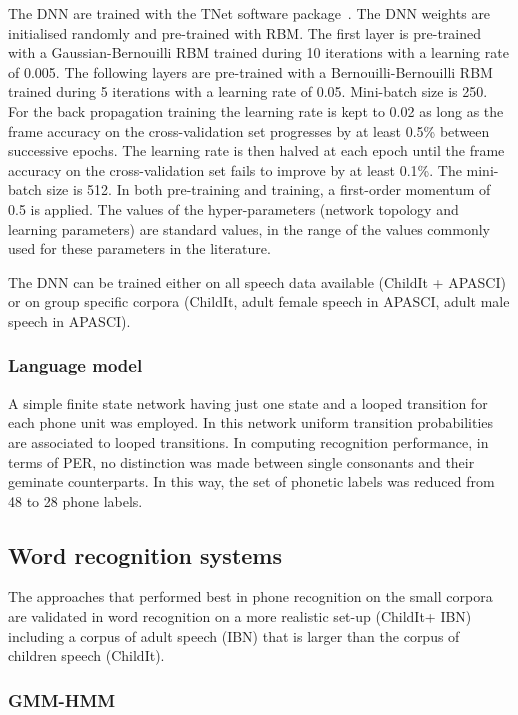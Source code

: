 \documentclass{nle}
\begin{document}
The DNN are trained with the TNet software package~\citep*{vesely10}. The DNN weights are initialised randomly and pre-trained with RBM. The first layer is pre-trained with a Gaussian-Bernouilli RBM trained during 10 iterations with a learning rate of 0.005. The following layers are pre-trained with a Bernouilli-Bernouilli RBM trained during 5 iterations with a learning rate of 0.05. Mini-batch size is 250. For the back propagation training the learning rate is kept to 0.02 as long as the frame accuracy on the cross-validation set progresses by at least 0.5\% between successive epochs. The learning rate is then halved at each epoch until the frame accuracy on the cross-validation set fails to improve by at least 0.1\%. The mini-batch size is 512. In both pre-training and training, a first-order momentum of 0.5 is applied. The values of the hyper-parameters (network topology and learning parameters) are standard values, in the range of the values commonly used for these parameters in the literature.

The DNN can be trained either on all speech data available  (ChildIt + APASCI) or on group specific corpora (ChildIt, adult female speech in APASCI, adult male speech in APASCI).

\subsubsection{Language model}
A simple finite state network having  just one state and a  looped transition for each
phone  unit   was  employed.   In  this   network  uniform  transition
probabilities  are  associated to  looped  transitions.  In  computing
recognition  performance,  in terms  of  PER,  no
distinction  was made  between  single consonants  and their  geminate
counterparts.  In this way, the  set of phonetic labels was reduced
from 48 to 28 phone labels.  



\subsection{Word recognition systems}
The approaches that performed best in phone recognition on the small corpora are validated in word recognition on a more realistic set-up (ChildIt+ IBN) including a corpus of adult speech (IBN) that is larger than the corpus of children speech (ChildIt).
\subsubsection{GMM-HMM}\label{sssection:baseW}
\end{document}
